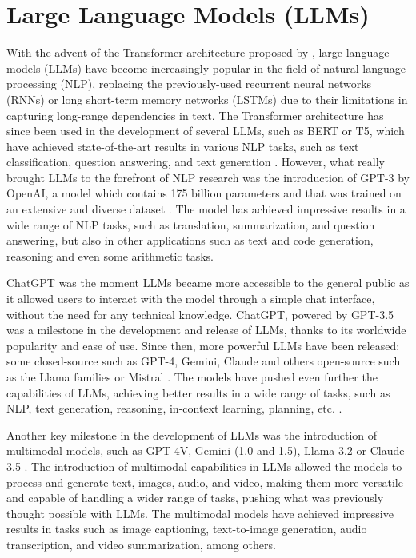 \section{Large Language Models (LLMs)}

With the advent of the Transformer architecture proposed by \textcite{llm}, large language models (LLMs) have become increasingly popular in the field of natural language processing (NLP), replacing the previously-used recurrent neural networks (RNNs) or long short-term memory networks (LSTMs) due to their limitations in capturing long-range dependencies in text. The Transformer architecture has since been used in the development of several LLMs, such as BERT or T5, which have achieved state-of-the-art results in various NLP tasks, such as text classification, question answering, and text generation \parencite{bert,t5}. 
However, what really brought LLMs to the forefront of NLP research was the introduction of GPT-3 by OpenAI, a model which contains 175 billion parameters and that was trained on an extensive and diverse dataset \parencite{gpt3}. The model has achieved impressive results in a wide range of NLP tasks, such as translation, summarization, and question answering, but also in other applications such as text and code generation, reasoning and even some arithmetic tasks. 

ChatGPT was the moment LLMs became more accessible to the general public as it allowed users to interact with the model through a simple chat interface, without the need for any technical knowledge. ChatGPT, powered by GPT-3.5 was a milestone in the development and release of LLMs, thanks to its worldwide popularity and ease of use. Since then, more powerful LLMs have been released: some closed-source such as GPT-4, Gemini, Claude and others open-source such as the Llama families or Mistral \parencite{gpt4,gemini,llama3,mistral}. The models have pushed even further the capabilities of LLMs, achieving better results in a wide range of tasks, such as NLP, text generation, reasoning, in-context learning, planning, etc. \parencite{llm2}. 

Another key milestone in the development of LLMs was the introduction of multimodal models, such as GPT-4V, Gemini (1.0 and 1.5), Llama 3.2 or Claude 3.5 \parencite{claude, gpt4v, llama32, gemini2}. The introduction of multimodal capabilities in LLMs allowed the models to process and generate text, images, audio, and video, making them more versatile and capable of handling a wider range of tasks, pushing what was previously thought possible with LLMs. The multimodal models have achieved impressive results in tasks such as image captioning, text-to-image generation, audio transcription, and video summarization, among others. 


